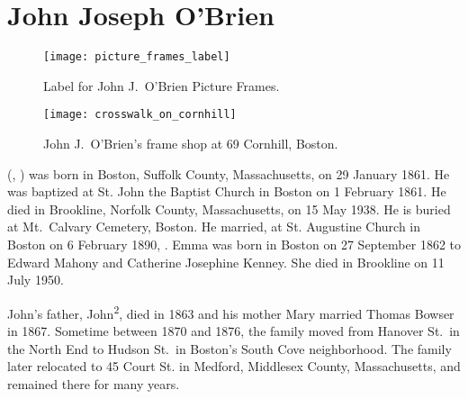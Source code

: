 \section{John Joseph O'Brien}\label{per:John3OBrien}

\begin{figure}[htbp]
	\centering
	\texttt{[image: picture\_frames\_label]}
	\caption{Label for John J.\ O'Brien Picture Frames.}
	\label{fig:PictureFrameLabel}
\end{figure}

\begin{figure}[p]
	\centering
	\texttt{[image: crosswalk\_on\_cornhill]}
	\caption{John J.\ O'Brien's frame shop at 69 Cornhill, Boston.}
	\label{fig:FrameStore}
\end{figure}

 (, ) was born in Boston, Suffolk County, Massachusetts, on 29 January 1861.\cite{John3OBrienBirth:4} He was baptized at St. John the Baptist Church in Boston on 1 February 1861.\cite{John3OBrienBaptism} He died in Brookline, Norfolk County, Massachusetts, on 15 May 1938.\cite{John3OBrienDeath} He is buried at Mt.\ Calvary Cemetery, Boston.\cite{John3OBrienBurial:1} He married, at St. Augustine Church in Boston on 6 February 1890, .\cite{John3OBrienMarriage} Emma was born in Boston on 27 September 1862 to Edward Mahony and Catherine Josephine Kenney.\cite{EmmaMahonyBaptism} She died in Brookline on 11 July 1950.\cite{EmmaMahonyDeath}

John's father, John\textsuperscript{2}, died in 1863\cite{John2OBrienDeath:3} and his mother Mary married Thomas Bowser in 1867.\cite{MaryMahoneyBowserMarriage:3} Sometime between 1870 and 1876, the family moved from Hanover St.\ in the North End to Hudson St.\ in Boston's South Cove neighborhood.\cite{ThomasBowser1870} The family later relocated to 45 Court St. in Medford, Middlesex County, Massachusetts, and remained there for many years.\cite{Census1910John3OBrien}

